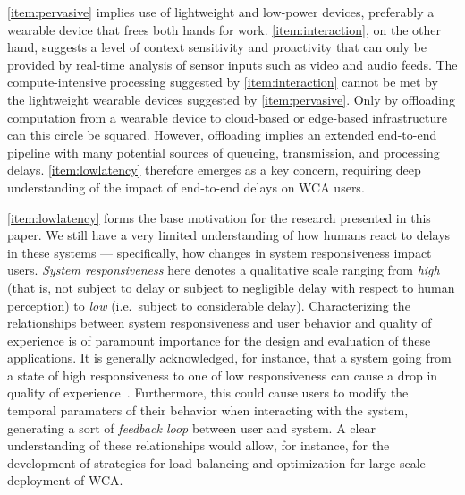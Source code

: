 \documentclass[10pt,letterpaper]{article}
\providecommand{\DIFaddtex}[1]{#1} %
\providecommand{\DIFdeltex}[1]{} %
\providecommand{\DIFaddbegin}{\protect\color{blue}} %
\providecommand{\DIFaddend}{\protect\color{black}} %
\providecommand{\DIFdelbegin}{\protect\color{red}} %
\providecommand{\DIFdelend}{\protect\color{black}} %
\providecommand{\DIFadd}[1]{\texorpdfstring{\DIFaddtex{#1}}{#1}} %
\providecommand{\DIFdel}[1]{\texorpdfstring{\DIFdeltex{#1}}{}} %
\newcommand{\DIFscaledelfig}{0.5}
\newlength{\DIFdelgraphicswidth} %
\newlength{\DIFdelgraphicsheight} %
\newcommand{\DIFaddincludegraphics}[2][]{{\color{blue}\fbox{\DIFOincludegraphics[#1]{#2}}}} %
\newcommand{\DIFdelincludegraphics}[2][]{%
\sbox{\DIFdelgraphicsbox}{\DIFOincludegraphics[#1]{#2}}%
\settoboxwidth{\DIFdelgraphicswidth}{\DIFdelgraphicsbox} %
\settoboxtotalheight{\DIFdelgraphicsheight}{\DIFdelgraphicsbox} %
\scalebox{\DIFscaledelfig}{%
\parbox[b]{\DIFdelgraphicswidth}{\usebox{\DIFdelgraphicsbox}\\[-\baselineskip] \rule{\DIFdelgraphicswidth}{0em}}\llap{\resizebox{\DIFdelgraphicswidth}{\DIFdelgraphicsheight}{%
\setlength{\unitlength}{\DIFdelgraphicswidth}%
\begin{picture}(1,1)%
\thicklines\linethickness{2pt} %
{\color[rgb]{1,0,0}\put(0,0){\framebox(1,1){}}}%
{\color[rgb]{1,0,0}\put(0,0){\line( 1,1){1}}}%
{\color[rgb]{1,0,0}\put(0,1){\line(1,-1){1}}}%
\end{picture}%
}\hspace*{3pt}}} %
} %
\DeclareRobustCommand{\DIFaddbegin}{\DIFOaddbegin \let\includegraphics\DIFaddincludegraphics} %
\DeclareRobustCommand{\DIFaddend}{\DIFOaddend \let\includegraphics\DIFOincludegraphics} %
\DeclareRobustCommand{\DIFdelbegin}{\DIFOdelbegin \let\includegraphics\DIFdelincludegraphics} %
\DeclareRobustCommand{\DIFdelend}{\DIFOaddend \let\includegraphics\DIFOincludegraphics} %
\begin{document}
\cref{item:pervasive} implies use of lightweight and low-power devices, preferably a wearable device that frees both hands for work.
\cref{item:interaction}, on the other hand, suggests a level of context sensitivity and proactivity that can only be provided by real-time analysis of sensor inputs such as video and audio feeds.
The compute-intensive processing suggested by \cref{item:interaction} cannot be met by the lightweight wearable devices suggested by \cref{item:pervasive}.
Only by offloading computation from a wearable device to cloud-based or edge-based infrastructure can this circle be squared.
However, offloading implies an extended end-to-end pipeline with many potential sources of queueing, transmission, and processing delays.
\cref{item:lowlatency} therefore emerges as a key concern, requiring deep understanding of the impact of end-to-end delays on WCA users.

\cref{item:lowlatency} forms the base motivation for the research presented in this paper.
We still have a very limited understanding of how humans react to delays in these systems --- specifically, how changes in system responsiveness impact users.
\emph{System responsiveness} here denotes a qualitative scale ranging from \emph{high} (that is, not subject to delay or subject to negligible delay with respect to human perception) to \emph{low} (i.e.\ subject to considerable delay).
Characterizing the relationships between system responsiveness and user behavior and \DIFaddbegin \DIFadd{quality of }\DIFaddend experience is of paramount importance for the design and evaluation of these applications.
\DIFaddbegin \DIFadd{It is generally acknowledged, for instance, that a system going from a state of high responsiveness to one of low responsiveness can cause a drop in quality of experience~}\cite{dabrowsky:2011:40years}\DIFadd{. 
Furthermore, this could cause users to modify the temporal paramaters of their behavior when interacting with the system, generating a sort of \emph{feedback loop} between user and system.
}\DIFaddend A clear understanding of these relationships would allow, for instance, for the development of strategies for load balancing and optimization for large-scale \DIFdelbegin \DIFdel{deployments }\DIFdelend \DIFaddbegin \DIFadd{deployment }\DIFaddend of WCA.\@
\end{document}
